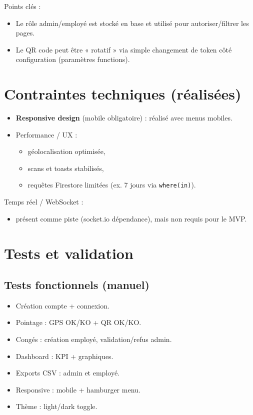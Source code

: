 \documentclass[12pt,a4paper]{article}
\begin{document}
Points clés :
\begin{itemize}[leftmargin=*]
  \item Le rôle admin/employé est stocké en base et utilisé pour autoriser/filtrer les pages.
  \item Le QR code peut être « rotatif » via simple changement de token côté configuration (paramètres functions).
\end{itemize}

\section{Contraintes techniques (réalisées)}
\begin{itemize}[leftmargin=*]
  \item \textbf{Responsive design} (mobile obligatoire) : réalisé avec menus mobiles.
  \item Performance / UX :
  \begin{itemize}
    \item géolocalisation optimisée,
    \item scans et toasts stabilisés,
    \item requêtes Firestore limitées (ex. 7 jours via \texttt{where(in)}).
  \end{itemize}
\end{itemize}

Temps réel / WebSocket :
\begin{itemize}[leftmargin=*]
  \item présent comme piste (socket.io dépendance), mais non requis pour le MVP.
\end{itemize}

\section{Tests et validation}
\subsection{Tests fonctionnels (manuel)}
\begin{itemize}[leftmargin=*]
  \item Création compte + connexion.
  \item Pointage : GPS OK/KO + QR OK/KO.
  \item Congés : création employé, validation/refus admin.
  \item Dashboard : KPI + graphiques.
  \item Exports CSV : admin et employé.
  \item Responsive : mobile + hamburger menu.
  \item Thème : light/dark toggle.
\end{itemize}
\end{document}
